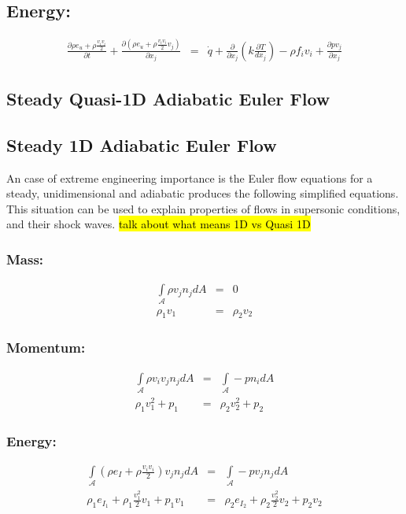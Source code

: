 \subsection*{Energy:}
\begin{eqnarray}        
\frac{\partial \rho e_u+ \rho\frac{v_i v_i}{2}}{\partial t} +  \frac{\partial (\rho e_u + \rho\frac{v_i v_i}{2} v_j)}{\partial x_j} &=&  \dot{q} + \frac{\partial} {\partial x_j} \left( k\frac{\partial T}{d x_j} \right) - \rho f_i v_i  + \frac{\partial  p v_j }{\partial x_j} 
\end{eqnarray}        


\subsection{Steady Quasi-1D Adiabatic Euler Flow}




\subsection{Steady 1D Adiabatic Euler Flow}
\label{1d_adiabatic_inviscid}
An case of extreme engineering importance is the Euler flow equations for a steady, unidimensional and adiabatic produces the following simplified equations. 
This situation can be used to explain properties of flows in supersonic conditions, and their shock waves.
\hl{talk about what means 1D vs Quasi 1D}
\subsubsection*{Mass:}
 \begin{eqnarray}        
    \int\limits_{\mathcal{A}} \rho v_j n_j dA &=& 0 \\ 
    \rho_1 v_1  &=&\rho_2 v_2 
\end{eqnarray}        

     
\subsubsection*{Momentum:}
\begin{eqnarray}        
    \int\limits_{\mathcal{A}} \rho v_i v_j n_j dA &=& \int\limits_{\mathcal{A}} - p n_i dA \\ 
    \rho_1 v^2_1 + p_1&=&  \rho_2 v^2_2 + p_2
\end{eqnarray}        

\subsubsection*{Energy:}
\begin{eqnarray}        
     \int\limits_{\mathcal{A}} (\rho e_I + \rho\frac{v_i v_i}{2}) v_j n_j dA &=& \int\limits_{\mathcal{A}} - p v_j n_j dA \\ 
     \rho_1 e_{I_1} + \rho_1\frac{v^2_1 }{2} v_1  + p_1 v_1 &=& \rho_2 e_{I_2} + \rho_2\frac{v^2_2 }{2} v_2 +  p_2 v_2  
\end{eqnarray}        

